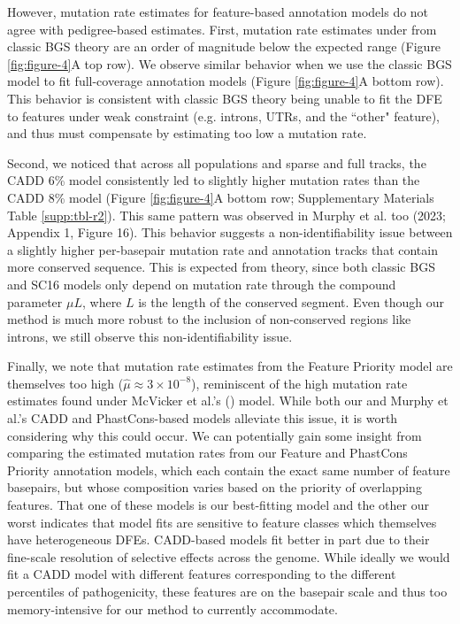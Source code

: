 \documentclass[11pt]{article}
\begin{document}
However, mutation rate estimates for feature-based annotation models
do not agree with pedigree-based estimates. First, mutation rate
estimates under from classic BGS theory are an order of
magnitude below the expected range (Figure \ref{fig:figure-4}A top row). We
observe similar behavior when we use the classic BGS model to fit full-coverage
annotation models (Figure \ref{fig:figure-4}A bottom row). This behavior is
consistent with classic BGS theory being unable to fit the DFE to features
under weak constraint (e.g. introns, UTRs, and the ``other" feature), and thus must compensate by estimating too low a mutation rate.

Second, we noticed that across all populations and sparse and full tracks, the CADD 6\% model consistently led to slightly higher mutation rates than the CADD 8\%
model (Figure \ref{fig:figure-4}A bottom row; Supplementary Materials Table
\ref{supp:tbl-r2}). This same pattern was observed in Murphy et al. too (2023;
Appendix 1, Figure 16). This behavior suggests a non-identifiability issue
between a slightly higher per-basepair mutation rate and annotation tracks that
contain more conserved sequence. This is expected from theory, since both
classic BGS and SC16 models only depend on mutation rate through the compound
parameter $\mu L$, where $L$ is the length of the conserved segment. Even
though our method is much more robust to the inclusion of non-conserved regions
like introns, we still observe this non-identifiability issue.

Finally, we note that mutation rate estimates from the Feature Priority model are themselves too high ($\widehat{\mu} \approx 3 \times 10^{-8}$), reminiscent of the high mutation rate estimates found under McVicker et al.'s
(\citeyear{McVicker2009-ax}) model. While both our and Murphy et al.'s CADD and
PhastCons-based models alleviate this issue, it is worth considering why this
could occur. We can potentially gain some insight from comparing the estimated mutation rates from our Feature and PhastCons Priority annotation models, which each contain the exact same number of feature basepairs, but whose composition varies based on the priority of overlapping features. That
one of these models is our best-fitting model and the other our worst
indicates that model fits are sensitive to feature classes which themselves have heterogeneous DFEs. CADD-based models fit better in part due to their
fine-scale resolution of selective effects across the genome. While ideally we
would fit a CADD model with different features corresponding to the different
percentiles of pathogenicity, these features are on the basepair scale and thus
too memory-intensive for our method to currently accommodate.
\end{document}
